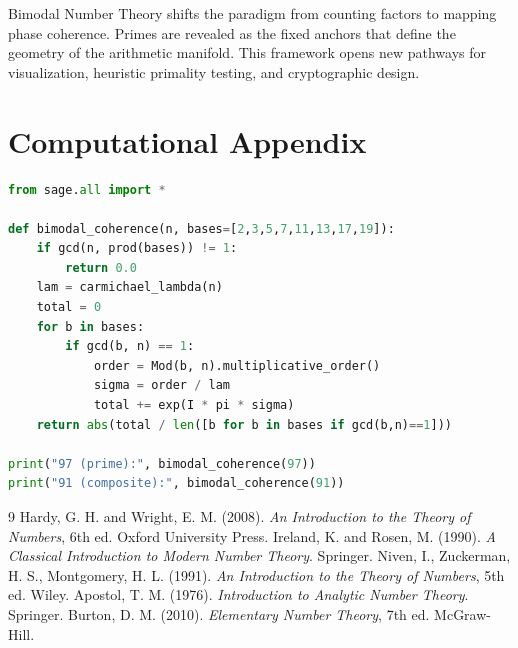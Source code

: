 \documentclass[11pt,a4paper]{article}
\theoremstyle{definition}
\begin{document}
Bimodal Number Theory shifts the paradigm from counting factors to mapping phase coherence. Primes are revealed as the fixed anchors that define the geometry of the arithmetic manifold. This framework opens new pathways for visualization, heuristic primality testing, and cryptographic design.

\appendix
\section{Computational Appendix}

\begin{lstlisting}[language=Python, caption={Broadband Coherence Calculator (SageMath/Python)}]
from sage.all import *

def bimodal_coherence(n, bases=[2,3,5,7,11,13,17,19]):
    if gcd(n, prod(bases)) != 1:
        return 0.0
    lam = carmichael_lambda(n)
    total = 0
    for b in bases:
        if gcd(b, n) == 1:
            order = Mod(b, n).multiplicative_order()
            sigma = order / lam
            total += exp(I * pi * sigma)
    return abs(total / len([b for b in bases if gcd(b,n)==1]))
    
print("97 (prime):", bimodal_coherence(97))
print("91 (composite):", bimodal_coherence(91))
\end{lstlisting}

\begin{thebibliography}{9}
 Hardy, G. H. and Wright, E. M. (2008). \emph{An Introduction to the Theory of Numbers}, 6th ed. Oxford University Press.
 Ireland, K. and Rosen, M. (1990). \emph{A Classical Introduction to Modern Number Theory}. Springer.
 Niven, I., Zuckerman, H. S., Montgomery, H. L. (1991). \emph{An Introduction to the Theory of Numbers}, 5th ed. Wiley.
 Apostol, T. M. (1976). \emph{Introduction to Analytic Number Theory}. Springer.
 Burton, D. M. (2010). \emph{Elementary Number Theory}, 7th ed. McGraw-Hill.
\end{thebibliography}
\end{document}

